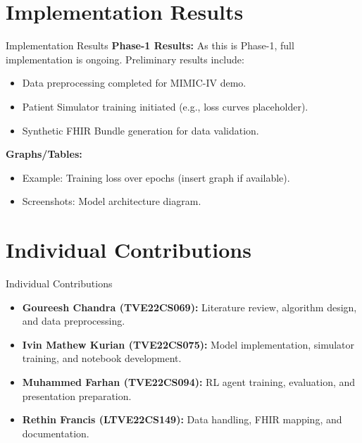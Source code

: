\documentclass[11pt]{beamer}
\begin{document}
\section{Implementation Results}
\begin{frame}{Implementation Results}
\textbf{Phase-1 Results:} As this is Phase-1, full implementation is ongoing. Preliminary results include:
\begin{itemize}
    \item Data preprocessing completed for MIMIC-IV demo.
    \item Patient Simulator training initiated (e.g., loss curves placeholder).
    \item Synthetic FHIR Bundle generation for data validation.
\end{itemize}

\textbf{Graphs/Tables:} 
\begin{itemize}
    \item Example: Training loss over epochs (insert graph if available).
    \item Screenshots: Model architecture diagram.
\end{itemize}
\end{frame}

\section{Individual Contributions}
\begin{frame}{Individual Contributions}
\begin{itemize}
    \item \textbf{Goureesh Chandra (TVE22CS069):} Literature review, algorithm design, and data preprocessing.
    \item \textbf{Ivin Mathew Kurian (TVE22CS075):} Model implementation, simulator training, and notebook development.
    \item \textbf{Muhammed Farhan (TVE22CS094):} RL agent training, evaluation, and presentation preparation.
    \item \textbf{Rethin Francis (LTVE22CS149):} Data handling, FHIR mapping, and documentation.
\end{itemize}
\end{frame}

\end{document}
